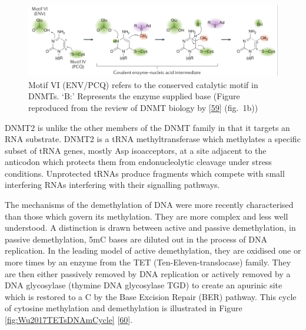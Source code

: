 \documentclass[
]{book}
\begin{document}
\begin{figure}

{\centering \includegraphics[width=0.8\linewidth]{figs/Lyko2017DNAmMechanism} 

}

\caption{Motif VI (ENV/PCQ) refers to the conserved catalytic motif in DNMTs. `B:' Represents the enzyme supplied base (Figure reproduced from the review of DNMT biology by {[}\protect\hyperlink{ref-Lyko2017}{59}{]} (fig.~1b))}\label{fig:Lyko2017DNAmMechanism}
\end{figure}



DNMT2 is unlike the other members of the DNMT family in that it targets an RNA substrate.
DNMT2 is a tRNA methyltransferase which methylates a specific subset of tRNA genes, mostly Asp isoacceptors, at a site adjacent to the anticodon which protects them from endonucleolytic cleavage under stress conditions.
Unprotected tRNAs produce fragments which compete with small interfering RNAs interfering with their signalling pathways.

The mechanisms of the demethylation of DNA were more recently characterised than those which govern its methylation.
They are more complex and less well understood.
A distinction is drawn between active and passive demethylation, in passive demethylation, 5mC bases are diluted out in the process of DNA replication.
In the leading model of active demethylation, they are oxidised one or more times by an enzyme from the TET (Ten-Eleven-translocase) family.
They are then either passively removed by DNA replication or actively removed by a DNA glycosylase (thymine DNA glycosylase TGD) to create an apurinic site which is restored to a C by the Base Excision Repair (BER) pathway. This cycle of cytosine methylation and demethylation is illustrated in Figure \ref{fig:Wu2017TETsDNAmCycle} {[}\protect\hyperlink{ref-Wu2017}{60}{]}.
\end{document}
